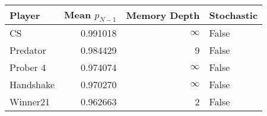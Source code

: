 \begin{tabular}{lrrl}
\toprule
    Player &  Mean $p_{N-1}$ &  Memory Depth & Stochastic \\
\midrule
        CS &        0.991018 &            \(\infty\) &      False \\
  Predator &        0.984429 &             9 &      False \\
  Prober 4 &        0.974074 &            \(\infty\) &      False \\
 Handshake &        0.970270 &            \(\infty\) &      False \\
  Winner21 &        0.962663 &             2 &      False \\
\bottomrule
\end{tabular}
